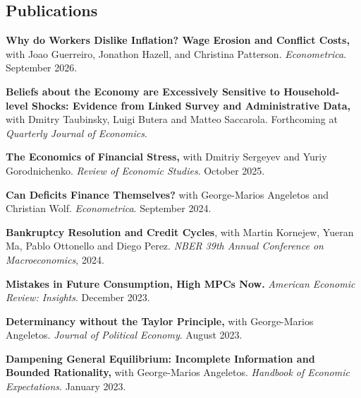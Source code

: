 \documentclass[line]{res}
\newenvironment{list1}{
  \begin{list}{\ding{113}}{%
      \setlength{\itemsep}{0.07in}
      \setlength{\parsep}{0in} \setlength{\parskip}{0in}
		\setlength{\topsep}{0.07in} \setlength{\partopsep}{0in}
      \setlength{\leftmargin}{0.0in}}}{\end{list}}
\begin{document}
\begin{resume}
\section{Publications}

\begin{list1}

\item[] \textbf{Why do Workers Dislike Inflation? Wage Erosion and Conflict Costs,} with Joao Guerreiro, Jonathon Hazell, and Christina Patterson. \emph{Econometrica}. September 2026.
\vspace{0.2cm}
\item[] \textbf{Beliefs about the Economy are Excessively Sensitive to Household-level Shocks: Evidence from Linked Survey and Administrative Data,} with Dmitry Taubinsky, Luigi Butera and Matteo Saccarola. Forthcoming at \emph{Quarterly Journal of Economics}.

\item[] \textbf{The Economics of Financial Stress,} with Dmitriy Sergeyev and Yuriy Gorodnichenko. \emph{Review of Economic Studies}. October 2025.
\vspace{0.2cm}

\item[] \textbf{Can Deficits Finance Themselves?} with George-Marios Angeletos and Christian Wolf. \emph{Econometrica}. September 2024. 
\vspace{0.2cm}

\item[] \textbf{Bankruptcy Resolution and Credit Cycles}, with Martin Kornejew, Yueran Ma, Pablo Ottonello and Diego Perez. \emph{NBER 39th Annual Conference on Macroeconomics}, 2024.
\vspace{0.2cm}

\item[] \textbf{Mistakes in Future Consumption, High MPCs Now.} \emph{American Economic Review: Insights}. December 2023.  
\vspace{0.2cm}

\item[] \textbf{Determinancy without the Taylor Principle,} with George-Marios Angeletos. \emph{Journal of Political Economy}. August 2023.

\vspace{0.2cm}

\item[] \textbf{Dampening General Equilibrium: Incomplete Information and Bounded Rationality,} with George-Marios Angeletos. \emph{Handbook of Economic Expectations}. January 2023.


\end{list1}
\end{resume}
\end{document}
